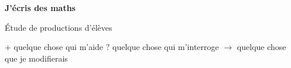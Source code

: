 \documentclass[aspectratio=169,11pt]{beamer}
\begin{document}

\begin{frame}[plain]

\vfill

\begin{center}

{\Huge\bfseries\color{TitreC}
J'écris des maths}

\vspace{0.3cm}

{\Large\color{SavoirC}
Étude de productions d'élèves}

\vspace{1cm}

{\large
\textbf{\(+\)}
quelque chose qui m'aide
\qquad
\textbf{\(?\)}
quelque chose qui m'interroge
\qquad
\textbf{\(\rightarrow\)}
quelque chose que je modifierais
}

\end{center}

\vfill

\end{frame}


\end{document}
